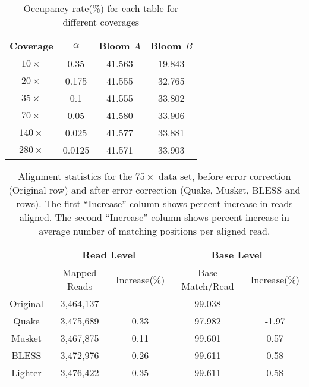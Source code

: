 \documentclass{bmcart}
\begin{document}
\begin{backmatter}
\begin{table}[h!]
\begin{tabular}{|c|c|c|c|c|c|c|c|}
\end{tabular}
\end{table}


\begin{table}[h!] %
\caption{Occupancy rate(\%) for each table for different coverages}
\begin{tabular}{|c|c|c|c|}\hline
Coverage & $\alpha$ & Bloom $A$ & Bloom $B$ \\ \hline
$10\times$	& 0.35 & 41.563  &	19.843 \\ \hline
$20\times$	& 0.175 & 41.555  &	32.765 \\ \hline
$35\times$ & 0.1 &41.555	& 33.802 \\ \hline
$70\times$ & 0.05 &41.580	& 33.906 \\ \hline
$140\times$ & 0.025 & 41.577 & 33.881  \\ \hline
$280\times$ & 0.0125 & 41.571 & 33.903 \\ \hline
\end{tabular}
\end{table}

\begin{table}[h!] %
\caption{Alignment statistics for the $75\times$ \ecoli data set, before error correction (Original row) and after error correction (Quake, Musket, BLESS and \tool rows).  The first ``Increase'' column shows percent increase in reads aligned.  The second ``Increase'' column shows percent increase in average number of matching positions per aligned read.}
\begin{tabular}{|c|c|c||c|c|} \hline
	 & \multicolumn{2}{|c||}{Read Level} & \multicolumn{2}{|c|}{Base Level} \\ \hline
     & Mapped Reads & Increase(\%) & Base Match/Read & Increase(\%) \\ \hline
Original & 	3,464,137	 & - & 99.038	& - \\ \hline
Quake	& 3,475,689	& 0.33	& 97.982	& -1.97  \\ \hline
Musket	& 3,467,875	& 0.11	& 99.601	& 0.57  \\ \hline
BLESS	& 3,472,976	& 0.26	& 99.611	& 0.58  \\ \hline
Lighter	&  3,476,422	& 0.35	& 99.611	& 0.58  \\ \hline
\end{tabular}
\end{table}


\end{backmatter}
\end{document}
